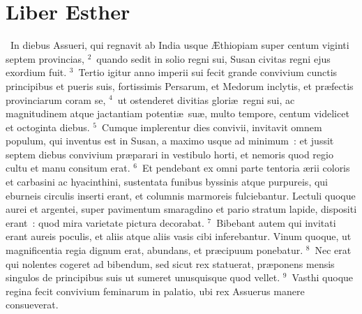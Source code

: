 {\centering \section*{Liber Esther}}\thispagestyle{empty}

~In diebus Assueri, qui regnavit ab India usque \AE thiopiam super centum viginti septem provincias,
${}^{2}$~quando sedit in solio regni sui, Susan civitas regni ejus exordium fuit.
${}^{3}$~Tertio igitur anno imperii sui fecit grande convivium cunctis principibus et pueris suis, fortissimis Persarum, et Medorum inclytis, et pr\ae fectis provinciarum coram se,
${}^{4}$~ut ostenderet divitias glori\ae\ regni sui, ac magnitudinem atque jactantiam potenti\ae\ su\ae , multo tempore, centum videlicet et octoginta diebus.
${}^{5}$~Cumque implerentur dies convivii, invitavit omnem populum, qui inventus est in Susan, a maximo usque ad minimum~: et jussit septem diebus convivium pr\ae parari in vestibulo horti, et nemoris quod regio cultu et manu consitum erat.
${}^{6}$~Et pendebant ex omni parte tentoria \ae rii coloris et carbasini ac hyacinthini, sustentata funibus byssinis atque purpureis, qui eburneis circulis inserti erant, et columnis marmoreis fulciebantur. Lectuli quoque aurei et argentei, super pavimentum smaragdino et pario stratum lapide, dispositi erant~: quod mira varietate pictura decorabat.
${}^{7}$~Bibebant autem qui invitati erant aureis poculis, et aliis atque aliis vasis cibi inferebantur. Vinum quoque, ut magnificentia regia dignum erat, abundans, et pr\ae cipuum ponebatur.
${}^{8}$~Nec erat qui nolentes cogeret ad bibendum, sed sicut rex statuerat, pr\ae ponens mensis singulos de principibus suis ut sumeret unusquisque quod vellet.
${}^{9}$~Vasthi quoque regina fecit convivium feminarum in palatio, ubi rex Assuerus manere consueverat.


